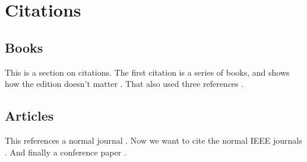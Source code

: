 \section{Citations} \label{sec:cites}
  \subsection{Books}
  This is a section on citations.  The first citation is a series of books, and
  shows how the edition doesn't matter 
  \cite{balanis_advanced_2012,poor_introduction_1998,mallat_wavelet_1998}.  
  That also used three references \cite{hastie_statistical_2015}.

  \subsection{Articles}
    This references a normal journal \cite{berger_adaptive_1984}.  Now we want
    to cite the normal IEEE journals \cite{gao_method_2004,manikas_array_2013}.
    And finally a conference paper \cite{bond_microwave_2002}.
